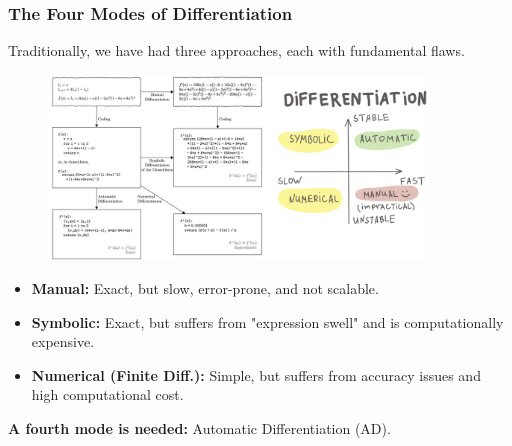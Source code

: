 \documentclass[notes]{beamer}
\begin{document}
\begin{frame}
\frametitle{The Four Modes of Differentiation}

Traditionally, we have had three approaches, each with fundamental flaws.

\begin{figure}[ht]
	\centering
	\includegraphics[width=0.9\textwidth]{figs/differentiation.png}
\end{figure}

\begin{itemize}
    \item \textbf{Manual:} Exact, but slow, error-prone, and not scalable.
    \item \textbf{Symbolic:} Exact, but suffers from "expression swell" and is computationally expensive.
    \item \textbf{Numerical (Finite Diff.):} Simple, but suffers from accuracy issues and high computational cost.
\end{itemize}

\textbf{A fourth mode is needed:} Automatic Differentiation (AD).

\end{frame}
\end{document}
